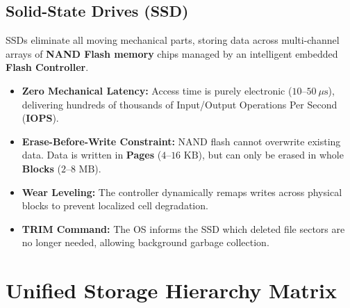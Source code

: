 \subsection{Solid-State Drives (SSD)}
SSDs eliminate all moving mechanical parts, storing data across multi-channel arrays of \textbf{NAND Flash memory} chips managed by an intelligent embedded \textbf{Flash Controller}.
\begin{itemize}
    \item \textbf{Zero Mechanical Latency:} Access time is purely electronic ($10$--$50\ \mu\text{s}$), delivering hundreds of thousands of Input/Output Operations Per Second (\textbf{IOPS}).
    \item \textbf{Erase-Before-Write Constraint:} NAND flash cannot overwrite existing data. Data is written in \textbf{Pages} ($4$--$16\text{ KB}$), but can only be erased in whole \textbf{Blocks} ($2$--$8\text{ MB}$).
    \item \textbf{Wear Leveling:} The controller dynamically remaps writes across physical blocks to prevent localized cell degradation.
    \item \textbf{TRIM Command:} The OS informs the SSD which deleted file sectors are no longer needed, allowing background garbage collection.
\end{itemize}


\section{Unified Storage Hierarchy Matrix}
\label{sec:storage_matrix}

